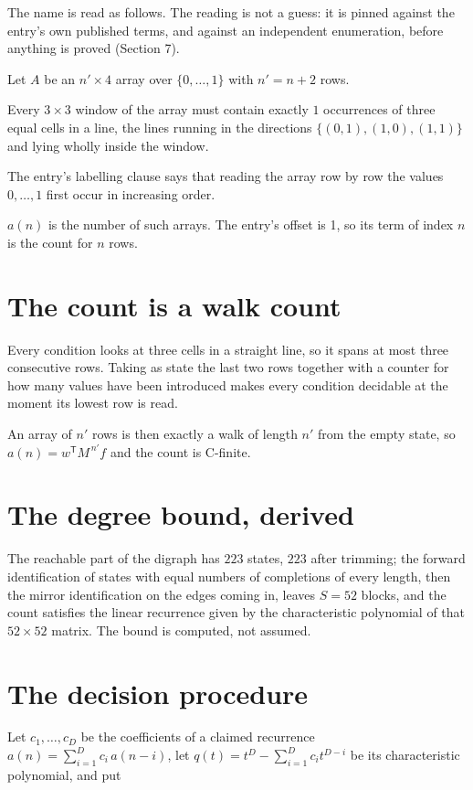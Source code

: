 \documentclass[11pt]{article}
\theoremstyle{definition}
\begin{document}
The name is read as follows. The reading is not a guess: it is pinned against the entry's own published terms, and against an independent enumeration, before anything is proved (Section 7).

Let $A$ be an $n' \times 4$ array over $\{0,\dots,1\}$ with $n' = n + 2$ rows.

Every $3\times3$ window of the array must contain exactly $1$ occurrences of three equal cells in a line, the lines running in the directions $\{(0,1), (1,0), (1,1)\}$ and lying wholly inside the window.

The entry's labelling clause says that reading the array row by row the values $0,\dots,1$ first occur in increasing order.

$a(n)$ is the number of such arrays. The entry's offset is 1, so its term of index $n$ is the count for $n$ rows.

\section{The count is a walk count}

Every condition looks at three cells in a straight line, so it spans at most three consecutive rows. Taking as state the last two rows together with a counter for how many values have been introduced makes every condition decidable at the moment its lowest row is read.

An array of $n'$ rows is then exactly a walk of length $n'$ from the empty state, so $a(n) = w^{\mathsf T}M^{\,n'}f$ and the count is C-finite.

\section{The degree bound, derived}

The reachable part of the digraph has $223$ states, $223$ after trimming; the forward identification of states with equal numbers of completions of every length, then the mirror identification on the edges coming in, leaves $S = 52$ blocks, and the count satisfies the linear recurrence given by the characteristic polynomial of that $52\times52$ matrix. The bound is computed, not assumed.

\section{The decision procedure}

Let $c_1,\dots,c_D$ be the coefficients of a claimed recurrence $a(n) = \sum_{i=1}^{D} c_i\,a(n-i)$, let $q(t) = t^{D} - \sum_{i=1}^{D} c_i t^{D-i}$ be its characteristic polynomial, and put
\end{document}
